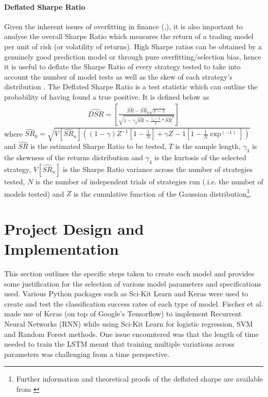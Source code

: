\documentclass[11pt]{article}
\begin{document}
\paragraph{Deflated Sharpe Ratio}
Given the inherent issues of overfitting in finance (\cite{Arnott2018},\cite{LopezdePrado2018}), it is also important to analyse the overall Sharpe Ratio \cite{Sharpe2009} which measures the return of a trading model per unit of risk (or volatility of returns). \newline High Sharpe ratios can be obtained by a genuinely good prediction model or through pure overfitting/selection bias, hence it is useful to deflate the Sharpe Ratio of every strategy tested to take into account the number of model tests as well as the skew of each strategy's distribution \cite{Bailey2014}. 
The Deflated Sharpe Ratio is a test statistic which can outline the probability of having found a true positive. It is defined below as
\begin{align}
\widehat{DSR} = \left[
		 				\frac{\widehat{SR}-\widehat{SR_{0}}\sqrt{T-1}}
						{\sqrt{1-\gamma_{3}\widehat{SR} + \frac{\gamma_{4} - 1}{4}*\widehat{SR}^{2}}} 
				 \right]
\end{align}
where $\widehat{SR}_{0} = \sqrt{V\left[\widehat{SR}_{n}\right] 
						\left(      	
							\left(1- \gamma\right) Z^{-1} \left[ 1- \frac{1}{N}\right] + \gamma Z^{}-1 \left[ 1-\frac{1}{N}\exp^(-1) \right] 
						 \right)}$
and $\widehat{SR}$ is the estimated Sharpe Ratio to be tested, $T$ is the sample length, $\gamma_{3}$ is the skewness of the returns distribution and $\gamma_{4}$ is the kurtosis of the selected strategy,  $V\left[\widehat{SR}_{n}\right]$ is the Sharpe Ratio variance across the number of strategies tested, $N$ is the number of independent trials of strategies run (.i.e. the number of models tested) and $Z$ is the cumulative function of the Gaussian distribution\footnote{Further information and theoretical proofs of the deflated sharpe are available from \cite{Bailey2014}}.  

\clearpage

\section{Project Design and Implementation} \label{ProjectD}
This section outlines the specific steps taken to create each model and provides some justification for the selection of various model parameters and specifications used.
Various Python packages such as Sci-Kit Learn and Keras were used to create and test the classification success rates of each type of model. Fischer et al. made use of Keras (on top of Google's Tensorflow) to implement Recurrent Neural Networks (RNN) \cite{Fischer2018} while using Sci-Kit Learn for logistic regression, SVM and Random Forest methods. \newline One issue encountered was that the length of time needed to train the LSTM meant that training multiple variations across parameters was challenging from a time perspective. 
\end{document}
